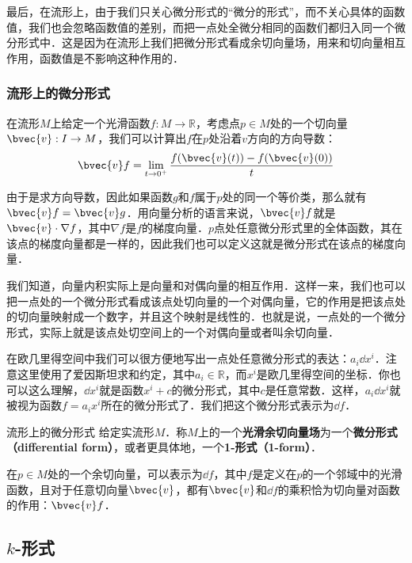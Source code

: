最后，在流形上，由于我们只关心微分形式的“微分的形式”，而不关心具体的函数值，我们也会忽略函数值的差别，而把一点处全微分相同的函数们都归入同一个微分形式中．这是因为在流形上我们把微分形式看成余切向量场，用来和切向量相互作用，函数值是不影响这种作用的．

\subsubsection{流形上的微分形式}

在流形$M$上给定一个光滑函数$f:M\rightarrow \mathbb{R}$，考虑点$p\in M$处的一个切向量$\bvec{v}:I\rightarrow M$，我们可以计算出$f$在$p$处沿着$v$方向的方向导数：
\begin{equation}
\bvec{v}f=\lim\limits_{t\rightarrow 0^+}\frac{f(\bvec{v}(t))-f(\bvec{v}(0))}{t}
\end{equation}

由于是求方向导数，因此如果函数$g$和$f$属于$p$处的同一个等价类，那么就有$\bvec{v}f=\bvec{v}g$．用向量分析的语言来说，$\bvec{v}f$就是$\bvec{v}\cdot\nabla f$，其中$\nabla f$是$f$的梯度向量．$p$点处任意微分形式里的全体函数，其在该点的梯度向量都是一样的，因此我们也可以定义这就是微分形式在该点的梯度向量．

我们知道，向量内积实际上是向量和对偶向量的相互作用．这样一来，我们也可以把一点处的一个微分形式看成该点处切向量的一个对偶向量，它的作用是把该点处的切向量映射成一个数字，并且这个映射是线性的．也就是说，一点处的一个微分形式，实际上就是该点处切空间上的一个对偶向量或者叫余切向量．

在欧几里得空间中我们可以很方便地写出一点处任意微分形式的表达：$a_i\dd x^i$．注意这里使用了爱因斯坦求和约定，其中$a_i\in\mathbb{R}$，而$x^i$是欧几里得空间的坐标．你也可以这么理解，$\dd x^i$就是函数$x^i+c$的微分形式，其中$c$是任意常数．这样，$a_i\dd x^i$就被视为函数$f=a_ix^i$所在的微分形式了．我们把这个微分形式表示为$\dd f$．

\begin{definition}{流形上的微分形式}
给定实流形$M$．称$M$上的一个\textbf{光滑余切向量场}为一个\textbf{微分形式（differential form）}，或者更具体地，一个\textbf{1-形式（1-form）}．

在$p\in M$处的一个余切向量，可以表示为$\dd f$，其中$f$是定义在$p$的一个邻域中的光滑函数，且对于任意切向量$\bvec{v}$，都有$\bvec{v}$和$\dd f$的乘积恰为切向量对函数的作用：$\bvec{v}f$．
\end{definition}

\subsection{$k$-形式}

